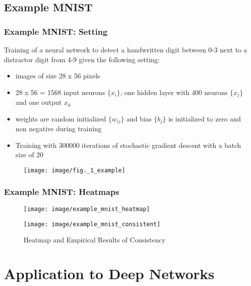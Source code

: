 \documentclass{beamer}
\begin{document}
\subsection[Example MINST]{Example MNIST}



\begin{frame}
\frametitle{Example MNIST: Setting}
\vspace{0.5cm}
Training of a neural network to detect a handwritten digit between 0-3 next to a distractor digit from 4-9 given the following setting:
\begin{itemize}
\item images of size 28 x 56 pixels
\item 28 x 56 = 1568 input neurons $\{x_i\}$, one hidden layer with 400 neurons $\{x_j\}$ and one output $x_k$
\item weights are random initialized $\{w_{ij}\}$ and bias $\{b_j\}$ is initialized to zero and non negative during training
\item Training with 300000 iterations of stochastic gradient descent with a batch size of 20 
\end{itemize}
\begin{figure}
\texttt{[image: image/fig.\_1\_example]}

\end{figure}
\end{frame}


\begin{frame}
\frametitle{Example MNIST: Heatmaps}
\vspace{0.5cm}
\begin{figure}
\texttt{[image: image/example\_mnist\_heatmap]}
\end{figure}

\begin{figure}
\texttt{[image: image/example\_mnist\_consistent]}
\vspace{-0.75cm}
\caption{Heatmap and Empirical Results of Consistency}
\end{figure}


\end{frame}



\section[Application to Deep Networks]{Application to Deep Networks}
\end{document}
